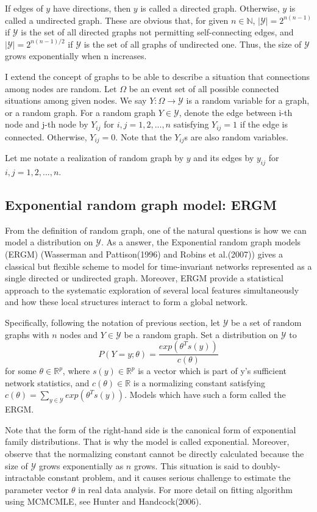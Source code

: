 \documentclass[aspectratio=169,ignorenonframetext,9pt]{beamer}
\theoremstyle{plain}
\theoremstyle{definition}
\begin{document}
If edges of $y$ have directions, then $y$ is called a directed graph. Otherwise, $y$ is called a undirected graph.
These are obvious that, for given $n\in \mathbb{N}$,
$|\mathcal{Y}|=2^{n(n-1)}$ if $\mathcal{Y}$ is the set of all directed graphs not permitting self-connecting edges,
and $|\mathcal{Y}|=2^{n(n-1)/2}$ if $\mathcal{Y}$ is the set of all graphs of undirected one.
Thus, the size of $\mathcal{Y}$ grows exponentially when n increases.

I extend the concept of graphs to be able to describe a situation that connections among nodes are random.
Let $\Omega$ be an event set of all possible connected situations among given nodes.
We say $Y: \Omega \to \mathcal{Y}$ is a random variable for a graph, or a random graph.
For a random graph $Y \in \mathcal{Y}$, denote the edge between i-th node and j-th node by $Y_{ij}$ for $i,j=1,2,...,n$
satisfying $Y_{ij}=1$ if the edge is connected. Otherwise, $Y_{ij}=0$.
Note that the $Y_{ij}$s are also random variables.

Let me notate a realization of random graph by $y$ and its edges by $y_{ij}$ for $i,j=1,2,...,n$.


\subsection{Exponential random graph model: ERGM}
From the definition of random graph, one of the natural questions is 
how we can model a distribution on $\mathcal{Y}$.
As a answer, the Exponential random graph models (ERGM) (Wasserman and Pattison(1996) and Robins et al.(2007)) %
gives a classical but 
flexible scheme to model for time-invariant networks represented as a single directed or undirected graph.
Moreover, ERGM provide a statistical approach to the systematic exploration of several local features simultaneously and 
how these local structures interact to form a global network.

Specifically, following the notation of previous section,
let $\mathcal{Y}$ be a set of random graphs with $n$ nodes and $Y \in \mathcal{Y}$ be a random graph.
Set a distribution on $\mathcal{Y}$ to
    \[P(Y=y;\theta) = \frac{exp(\theta^{T}s(y))}{c(\theta)}\]
for some $\theta\in\mathbb{R}^p$,
where $s(y)\in\mathbb{R}^p$ is a vector which is part of y's sufficient network statistics,
and $c(\theta)\in\mathbb{R}$ is a normalizing constant satisfying $c(\theta)=\sum_{y\in\mathcal{Y}}exp(\theta^{T}s(y))$.
Models which have such a form called the ERGM.

Note that the form of the right-hand side is the canonical form of exponential family distributions.
That is why the model is called exponential. Moreover, observe that the normalizing constant cannot be directly calculated
because the size of $\mathcal{Y}$ grows exponentially as $n$ grows.
This situation is said to doubly-intractable constant problem, and it causes serious challenge to estimate the parameter vector $\theta$
in real data analysis. For more detail on fitting algorithm using MCMCMLE, see Hunter and Handcock(2006).%
\end{document}
